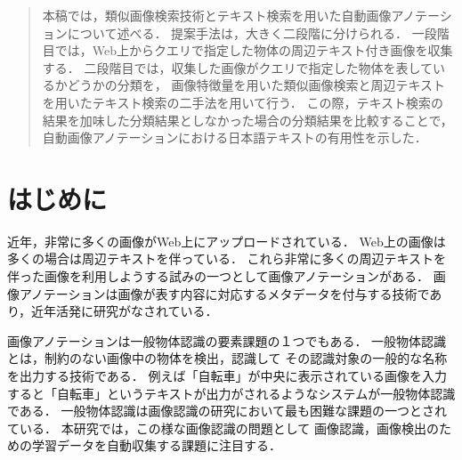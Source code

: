 
\begin{abstract}
本稿では，類似画像検索技術とテキスト検索を用いた自動画像アノテーションについて述べる．
提案手法は，大きく二段階に分けられる．
一段階目では，Web上からクエリで指定した物体の周辺テキスト付き画像を収集する．
二段階目では，収集した画像がクエリで指定した物体を表しているかどうかの分類を，
画像特徴量を用いた類似画像検索と周辺テキストを用いたテキスト検索の二手法を用いて行う．
この際，テキスト検索の結果を加味した分類結果としなかった場合の分類結果を比較することで，
自動画像アノテーションにおける日本語テキストの有用性を示した．
\end{abstract}



\chapter{はじめに}



近年，非常に多くの画像がWeb上にアップロードされている．
Web上の画像は多くの場合は周辺テキストを伴っている．
これら非常に多くの周辺テキストを伴った画像を利用しようする試みの一つとして画像アノテーションがある．
画像アノテーションは画像が表す内容に対応するメタデータを付与する技術であり，近年活発に研究がなされている\cite{jeon,watanabe}．

画像アノテーションは一般物体認識の要素課題の１つでもある．
一般物体認識とは，制約のない画像中の物体を検出，認識して
その認識対象の一般的な名称を出力する技術である．
例えば「自転車」が中央に表示されている画像を入力すると「自転車」というテキストが出力がされるようなシステムが一般物体認識である．
一般物体認識は画像認識の研究において最も困難な課題の一つとされている．
%
本研究では，この様な画像認識の問題として
画像認識，画像検出のための学習データを自動収集する課題に注目する．

